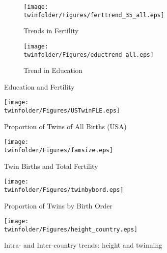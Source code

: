 \begin{figure}[htpb!]
\centering
\begin{subfigure}{.5\textwidth}
  \centering
  \texttt{[image: \\twinfolder/Figures/ferttrend\_35\_all.eps]}
  \caption{Trends in Fertility}
  \label{TWINfig:fertrend}
\end{subfigure}%
\begin{subfigure}{.5\textwidth}
  \centering
  \texttt{[image: \\twinfolder/Figures/eductrend\_all.eps]}
  \caption{Trend in Education}
  \label{TWINfig:eductrend}
\end{subfigure}
\caption{Education and Fertility}
\label{TWINfig:trends}
\end{figure}
\vspace{1cm}

\begin{figure}[htpb!]
\begin{center}
\caption{Proportion of Twins of All Births (USA)}
\label{TWINfig:bord}
\texttt{[image: \\twinfolder/Figures/USTwinFLE.eps]} 
\end{center}
\end{figure}

\begin{figure}[htpb!]
\begin{center}
\caption{Twin Births and Total Fertility}
\label{TWINfig:births}
\texttt{[image: \\twinfolder/Figures/famsize.eps]} 
\end{center}
\end{figure}

\begin{figure}[htpb!]
\begin{center}
\caption{Proportion of Twins by Birth Order}
\label{TWINfig:bord}
\texttt{[image: \\twinfolder/Figures/twinbybord.eps]} 
\end{center}
\end{figure}

\begin{figure}[htpb!]
\begin{center}
\caption{Intra- and Inter-country trends: height and twinning}
\label{TWINfig:arrows}
\texttt{[image: \\twinfolder/Figures/height\_country.eps]} 
\end{center}
\end{figure}

